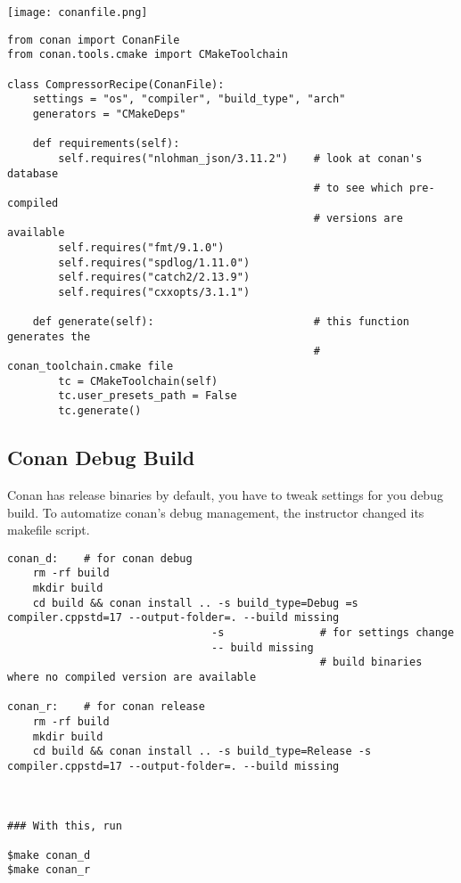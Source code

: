 \begin{center}
    \texttt{[image: conanfile.png]}
\end{center}

\begin{verbatim}
from conan import ConanFile
from conan.tools.cmake import CMakeToolchain

class CompressorRecipe(ConanFile):
    settings = "os", "compiler", "build_type", "arch"
    generators = "CMakeDeps"

    def requirements(self):
        self.requires("nlohman_json/3.11.2")    # look at conan's database
                                                # to see which pre-compiled
                                                # versions are available
        self.requires("fmt/9.1.0")
        self.requires("spdlog/1.11.0")
        self.requires("catch2/2.13.9")
        self.requires("cxxopts/3.1.1")

    def generate(self):                         # this function generates the
                                                # conan_toolchain.cmake file
        tc = CMakeToolchain(self)
        tc.user_presets_path = False
        tc.generate()
\end{verbatim}

\subsection{Conan Debug Build}

Conan has release binaries by default, you have to tweak settings for you debug build.
To automatize conan's debug management, the instructor changed its makefile script.


\begin{verbatim}
conan_d:    # for conan debug
    rm -rf build
    mkdir build
    cd build && conan install .. -s build_type=Debug =s compiler.cppstd=17 --output-folder=. --build missing
                                -s               # for settings change
                                -- build missing 
                                                 # build binaries where no compiled version are available

conan_r:    # for conan release
    rm -rf build
    mkdir build
    cd build && conan install .. -s build_type=Release -s compiler.cppstd=17 --output-folder=. --build missing



### With this, run

$make conan_d
$make conan_r
\end{verbatim}  


